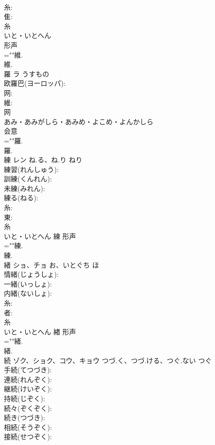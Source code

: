 \documentclass[8pt]{extreport}
\begin{document}
\begin{CJK}{UTF8}{min}
\\	糸: 
\\	隹: 
\\	糸	
\\	いと・いとへん	
\\	形声 
\\	=""維.
\\	維.
\\	羅	ラ	うすもの		
\\	欧羅巴(ヨーロッパ): 
\\	网: 
\\	維: 
\\	网	
\\	あみ・あみがしら・あみめ・よこめ・よんかしら	
\\	会意 
\\	=""羅.
\\	羅.
\\	練	レン	ね.る、ね.り	ねり	
\\	練習(れんしゅう): 
\\	訓練(くんれん): 
\\	未練(みれん): 
\\	練る(ねる): 
\\	糸: 
\\	東: 
\\	糸	
\\	いと・いとへん	練	形声 
\\	=""練.
\\	練.
\\	緒	ショ、チョ	お、いとぐち	ほ	
\\	情緒(じょうしょ): 
\\	一緒(いっしょ): 
\\	内緒(ないしょ): 
\\	糸: 
\\	者: 
\\	糸	
\\	いと・いとへん	緖	形声 
\\	=""緒.
\\	緒.
\\	続	ゾク、ショク、コウ、キョウ	つづ.く、つづ.ける、つぐ.ない	つぐ	
\\	手続(てつづき): 
\\	連続(れんぞく): 
\\	継続(けいぞく): 
\\	持続(じぞく): 
\\	続々(ぞくぞく): 
\\	続き(つづき): 
\\	相続(そうぞく): 
\\	接続(せつぞく): 

\end{CJK}
\end{document}
